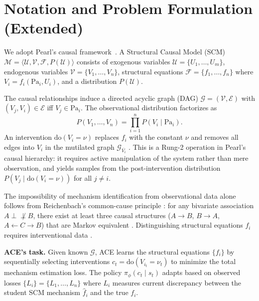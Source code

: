 \section{Notation and Problem Formulation (Extended)}
\label{app:notation}

We adopt Pearl's causal framework~\citep{pearl2009causality,pearl1995causal}. A Structural Causal Model (SCM) $\mathcal{M} = \langle \mathcal{U}, \mathcal{V}, \mathcal{F}, P(\mathcal{U}) \rangle$ consists of exogenous variables $\mathcal{U} = \{U_1, \ldots, U_m\}$, endogenous variables $\mathcal{V} = \{V_1, \ldots, V_n\}$, structural equations $\mathcal{F} = \{f_1, \ldots, f_n\}$ where $V_i = f_i(\text{Pa}_i, U_i)$, and a distribution $P(\mathcal{U})$.

The causal relationships induce a directed acyclic graph (DAG) $\mathcal{G} = (\mathcal{V}, \mathcal{E})$ with $(V_j, V_i) \in \mathcal{E}$ iff $V_j \in \text{Pa}_i$. The observational distribution factorizes as
\begin{equation}
P(V_1, \ldots, V_n) = \prod_{i=1}^n P(V_i \mid \text{Pa}_i).
\end{equation}
An intervention $\text{do}(V_i = \nu)$ replaces $f_i$ with the constant $\nu$ and removes all edges into $V_i$ in the mutilated graph $\mathcal{G}_{\overline{V_i}}$ \citep{pearl2009causality}. This is a Rung-2 operation in Pearl's causal hierarchy: it requires active manipulation of the system rather than mere observation, and yields samples from the post-intervention distribution $P(V_j \mid \text{do}(V_i = \nu))$ for all $j \ne i$.

The impossibility of mechanism identification from observational data alone follows from Reichenbach's common-cause principle \citep{reichenbach1956}: for any bivariate association $A \perp\!\!\!\!\not\perp B$, there exist at least three causal structures ($A \to B$, $B \to A$, $A \leftarrow C \rightarrow B$) that are Markov equivalent \citep{spirtes2000causation,peters2017elements}. Distinguishing structural equations $f_i$ requires interventional data \citep{peters2017elements}.

\textbf{ACE's task.} Given known $\mathcal{G}$, ACE learns the structural equations $\{f_i\}$ by sequentially selecting interventions $c_t = \text{do}(V_{i_t} = \nu_t)$ to minimize the total mechanism estimation loss. The policy $\pi_\phi(c_t \mid s_t)$ adapts based on observed losses $\{L_i\} = \{L_1, \ldots, L_n\}$ where $L_i$ measures current discrepancy between the student SCM mechanism $\hat{f}_i$ and the true $f_i$.


